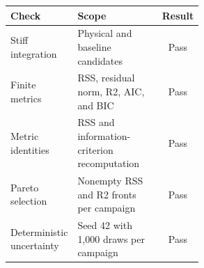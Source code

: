 \begin{tabular}{l p{0.55\linewidth} c}
\toprule
Check & Scope & Result \\
\midrule
Stiff integration & Physical and baseline candidates & Pass \\
Finite metrics & RSS, residual norm, R2, AIC, and BIC & Pass \\
Metric identities & RSS and information-criterion recomputation & Pass \\
Pareto selection & Nonempty RSS and R2 fronts per campaign & Pass \\
Deterministic uncertainty & Seed 42 with 1,000 draws per campaign & Pass \\
\bottomrule
\end{tabular}
